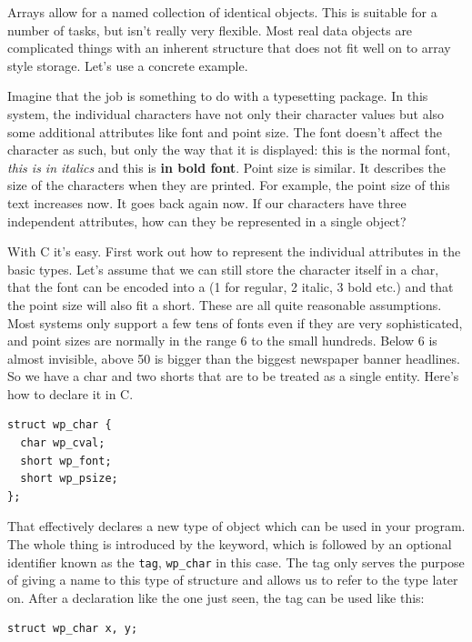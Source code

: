   

  Arrays allow for a named collection of identical objects. This is suitable
   for a number of tasks, but isn't really very flexible. Most real data
   objects are complicated things with an inherent structure that does not fit
   well on to array style storage. Let's use a concrete example.


  Imagine that the job is something to do with a typesetting package. In
    this system, the individual characters have not only their character values
    but also some additional attributes like font and point size. The font
    doesn't affect the character as such, but only the way that it is
    displayed: this is the normal font, \textit{this is in italics} and this is
    \textbf{in bold font}. Point size is similar. It describes the size of
    the characters when they are printed. For example, the point size of this
    text increases  {\large{now. It goes back again}} now.  If
    our characters have three independent attributes, how can they be
    represented in a single object?


  With C it's easy. First work out how to represent the individual
   attributes in the basic types. Let's assume that we can still store the
   character itself in a char, that the font can be encoded into
   a \short{} (1 for regular, 2 italic, 3 bold etc.) and that the
   point size will also fit a short. These are all quite reasonable
   assumptions.  Most systems only support a few tens of fonts even if they are
   very sophisticated, and point sizes are normally in the range 6 to the small
   hundreds. Below 6 is almost invisible, above 50 is bigger than the biggest
   newspaper banner headlines. So we have a char and two shorts that are to be
   treated as a single entity. Here's how to declare it in C.


  \begin{Verbatim}
struct wp_char {
  char wp_cval;
  short wp_font;
  short wp_psize;
};
\end{Verbatim}

  That effectively declares a new type of object which can be used in your
   program. The whole thing is introduced by the \struct{} keyword,
   which is followed by an optional identifier known as the \texttt{tag},
   \texttt{wp\_char} in this case. The tag only serves the purpose of giving
   a name to this type of structure and allows us to refer to the type later
   on.  After a declaration like the one just seen, the tag can be used like
   this:


  \begin{Verbatim}
struct wp_char x, y;
\end{Verbatim}

